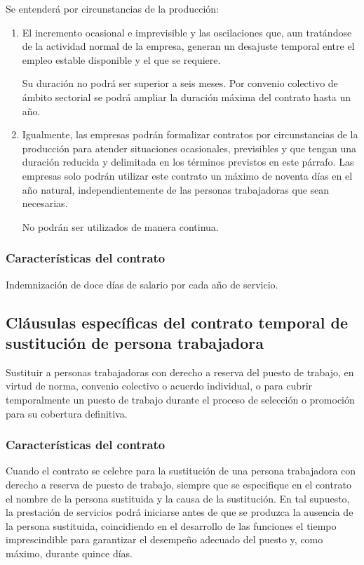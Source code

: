 \documentclass{article}
\begin{document}
	Se entenderá por circunstancias de la producción:
	
	\begin{enumerate}
		\item El incremento ocasional e imprevisible y las oscilaciones que, aun tratándose de la actividad normal de la empresa, generan un desajuste temporal entre el empleo estable disponible y el que se requiere.
		
		Su duración no podrá ser superior a seis meses. Por convenio colectivo de ámbito sectorial se podrá ampliar la duración máxima del contrato hasta un año.
		
		\item Igualmente, las empresas podrán formalizar contratos por circunstancias de la producción para atender situaciones ocasionales, previsibles y que tengan una duración reducida y delimitada en los términos previstos en este párrafo. Las empresas solo podrán utilizar este contrato un máximo de noventa días en el año natural, independientemente de las personas trabajadoras que sean necesarias.
		
		No podrán ser utilizados de manera continua.
	\end{enumerate}
	
	\subsubsection*{Características del contrato}
	
	Indemnización de doce días de salario por cada año de servicio.
	
	\subsection*{Cláusulas específicas del contrato temporal de sustitución de persona trabajadora}
	
	Sustituir a personas trabajadoras con derecho a reserva del puesto de trabajo, en virtud de norma, convenio colectivo o acuerdo individual, o para cubrir temporalmente un puesto de trabajo durante el proceso de selección o promoción para su cobertura definitiva.
	
	\subsubsection*{Características del contrato}
	
	Cuando el contrato se celebre para la sustitución de una persona trabajadora con derecho a reserva de puesto de trabajo, siempre que se especifique en el contrato el nombre de la persona sustituida y la causa de la sustitución. En tal supuesto, la prestación de servicios podrá iniciarse antes de que se produzca la ausencia de la persona sustituida, coincidiendo en el desarrollo de las funciones el tiempo imprescindible para garantizar el desempeño adecuado del puesto y, como máximo, durante quince días.
	
\end{document}
